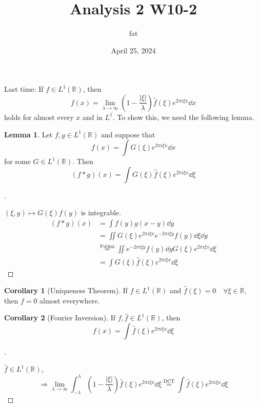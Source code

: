 \documentclass{article}
\title{Analysis 2 W10-2}
\author{fat}
\date{April 25, 2024}
\theoremstyle{definition}
\newtheorem{lem}{Lemma}
\newtheorem{cor}{Corollary}
\newenvironment{proofs}[1][\proofname]{%
  \begin{proof}[#1]$ $\par\nobreak\ignorespaces
}{%
  \end{proof}
}
\newcommand{\RR}{\mathbb R}
\newcommand{\Ra}{\Rightarrow}
\begin{document}
\maketitle
\thispagestyle{fancy}
\renewcommand{\footrulewidth}{0.4pt}
\cfoot{\thepage}
\renewcommand{\headrulewidth}{0.4pt}

Last time: 
If $f \in L^1(\RR)$, then
\[
	f(x) = \lim_{\lambda \to \infty} \left( 1 - \frac{|\xi|}{\lambda} \right) \widehat{f}(\xi) e^{2 \pi i \xi x} \dd{x}
\]
holds for almost every $x$ and in $L^1$.
To show this, we need the following lemma.

\begin{lem}
	Let $f, g \in L^1(\RR)$ and suppose that
	\[
		f(x) = \int G(\xi) e^{2 \pi i \xi x} \dd{x}
	\]
	for some $G \in L^1(\RR)$.
	Then
	\[
		(f*g)(x) = \int G(\xi) \widehat{f}(\xi) e^{2 \pi i \xi x} \dd{\xi}
	\]
\end{lem}

\begin{proofs}
	$(\xi, y) \mapsto G(\xi) f(y)$ is integrable.
	\[
		\begin{split}
			(f * g)(x) &= \int f(y) g(x - y) \dd{y}\\
			&= \iint G(\xi) e^{2 \pi i \xi x} e^{-2 \pi i \xi y} f(y) \dd{\xi} \dd{y}\\
			&\stackrel{\text{Fubini}}{=} \iint e^{-2 \pi i \xi y}f(y) \dd{y} G(\xi) e^{2 \pi i \xi x} \dd{\xi}\\
			&= \int G(\xi) \widehat{f}(\xi) e^{2 \pi i \xi x} \dd{\xi}
		\end{split}
	\]
\end{proofs}

\begin{cor}[Uniqueness Theorem]
	If $f \in L^1(\RR)$ and $\widehat{f}(\xi) = 0  \quad \forall \xi \in \RR$, then $f = 0$ almost everywhere.
\end{cor}

\begin{cor}[Fourier Inversion]
	If $f, \widehat{f} \in L^1(\RR)$, then
	\[
		f(x) = \int \widehat{f}(\xi) e^{2 \pi i \xi x} \dd{\xi}
	\]
\end{cor}

\begin{proofs}
	$\widehat{f} \in L^1(\RR)$,
	\[
		\Ra \lim_{\lambda \to \infty} \int_{-\lambda}^\lambda \left( 1 - \frac{|\xi|}{\lambda} \right) \widehat{f}(\xi) e^{2 \pi i \xi x} \dd{\xi} \stackrel{\text{DCT}}{=}\int \widehat{f}(\xi) e^{2 \pi i \xi x} \dd{\xi}
	\]
\end{proofs}
\end{document}

